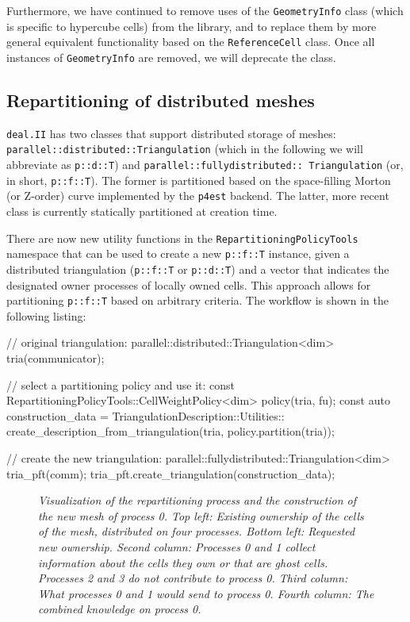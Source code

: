 \documentclass{ansarticle-preprint}
\newcommand{\specialword}[1]{\texttt{#1}}
\newcommand{\dealii}{{\specialword{deal.II}}\xspace}
\newcommand{\pfrst}{{\specialword{p4est}}\xspace}
\begin{document}
Furthermore, we have continued to remove uses of the
\texttt{GeometryInfo} class (which is specific to hypercube cells) from
the library, and to replace them by more general equivalent
functionality based on the
\texttt{ReferenceCell} class. Once all instances of
\texttt{GeometryInfo} are removed, we will deprecate the class.

\subsection{Repartitioning of distributed meshes}\label{sec:repartitioning}

\dealii{} has two classes that support distributed storage of meshes: 
\texttt{parallel::\allowbreak distributed::\allowbreak Triangulation}
(which in the following we will abbreviate as \texttt{p::d::T}) and
\texttt{parallel::\allowbreak fully\allowbreak distributed::\allowbreak
  Triangulation} (or, in short, \texttt{p::f::T}). The former is
partitioned based on the space-filling Morton (or Z-order) curve
implemented by the \pfrst{} backend. The latter, more recent
class is currently statically partitioned at creation time.

There are now new utility functions in the
\texttt{RepartitioningPolicyTools} namespace that can be
used to create a new \texttt{p::f::T} instance,
given a distributed triangulation (\texttt{p::f::T} or
\texttt{p::d::T}) and a vector that indicates the designated owner processes of locally
owned cells. This approach allows for partitioning \texttt{p::f::T}
based on arbitrary criteria. The workflow is shown in the following listing:
\begin{c++}
// original triangulation:
parallel::distributed::Triangulation<dim> tria(communicator);

// select a partitioning policy and use it:
const RepartitioningPolicyTools::CellWeightPolicy<dim> policy(tria, fu);
const auto construction_data = TriangulationDescription::Utilities::
  create_description_from_triangulation(tria, policy.partition(tria));

// create the new triangulation:
parallel::fullydistributed::Triangulation<dim> tria_pft(comm);
tria_pft.create_triangulation(construction_data);
\end{c++}

\begin{figure}
    \centering
    \def\svgwidth{0.8\columnwidth}
    
    \caption{\it Visualization of the repartitioning process and the
      construction of the new mesh of process 0. Top
      left: Existing ownership of the cells of the mesh, distributed
      on four processes. Bottom left:
      Requested new ownership. Second column: Processes 0 and 1
      collect information about the cells they own or that are ghost
      cells. Processes 2 and 3 do not contribute to process 0. Third column: What
      processes 0 and 1 would send to process 0. Fourth column: The
      combined knowledge on process 0.}\label{fig:repartitioning}
\end{figure}
\end{document}

